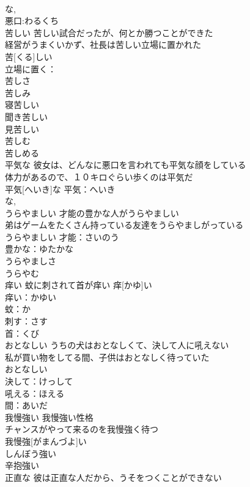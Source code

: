 \documentclass[8pt]{extreport}
\begin{document}
\begin{CJK}{UTF8}{min}
\\	な, 
\\	悪口:わるくち
\\	苦しい	苦しい試合だったが、何とか勝つことができた 
\\	経営がうまくいかず、社長は苦しい立場に置かれた 
\\	苦[くる]しい			
\\	立場に置く：
\\	苦しさ 
\\	苦しみ 
\\	寝苦しい 
\\	聞き苦しい 
\\	見苦しい 
\\	苦しむ 
\\	苦しめる 
\\	平気な	彼女は、どんなに悪口を言われても平気な顔をしている 
\\	体力があるので、１０キロぐらい歩くのは平気だ 
\\	平気[へいき]な			平気：へいき
\\	な, 
\\	うらやましい	才能の豊かな人がうらやましい 
\\	弟はゲームをたくさん持っている友達をうらやましがっている 
\\	うらやましい			才能：さいのう
\\	豊かな：ゆたかな
\\	うらやましさ 
\\	うらやむ 
\\	痒い	蚊に刺されて首が痒い	痒[かゆ]い	
\\	痒い：かゆい
\\	蚊：か
\\	刺す：さす
\\	首：くび
\\	おとなしい	うちの犬はおとなしくて、決して人に吼えない 
\\	私が買い物をしてる間、子供はおとなしく待っていた 
\\	おとなしい			
\\	決して：けっして
\\	吼える：ほえる
\\	間：あいだ
\\	我慢強い	我慢強い性格 
\\	チャンスがやって来るのを我慢強く待つ 
\\	我慢強[がまんづよ]い			
\\	しんぼう強い 
\\	辛抱強い	
\\	正直な	彼は正直な人だから、うそをつくことができない 

\end{CJK}
\end{document}
